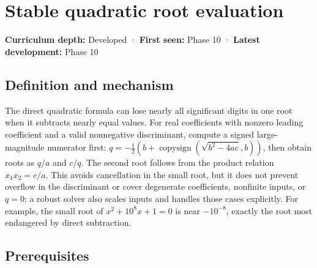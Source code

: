 \hypertarget{appendix-b9afba7f63e5}{}\label{referencestart:appendix-b9afba7f63e5}
\section{Stable quadratic root evaluation}\label{appendix-b9afba7f63e5-stable-quadratic-root-evaluation}

\hypertarget{appendix-b9afba7f63e5-stable-quadratic-root-evaluation}{}

\textbf{Curriculum depth:} Developed · \textbf{First seen:} Phase 10 · \textbf{Latest development:} Phase 10

\begin{allmightroledefinition}

\subsection{Definition and mechanism}\label{appendix-b9afba7f63e5-definition-and-mechanism}

\hypertarget{appendix-b9afba7f63e5-definition-and-mechanism}{}

The direct quadratic formula can lose nearly all significant digits in one root when it subtracts nearly equal values. For real coefficients with nonzero leading coefficient and a valid nonnegative discriminant, compute a signed large-magnitude numerator first: \(q=-\frac12(b+\operatorname{copysign}(\sqrt{b^2-4ac},b))\), then obtain roots as \(q/a\) and \(c/q\). The second root follows from the product relation \(x_1x_2=c/a\). This avoids cancellation in the small root, but it does not prevent overflow in the discriminant or cover degenerate coefficients, nonfinite inputs, or \(q=0\); a robust solver also scales inputs and handles those cases explicitly. For example, the small root of \(x^2+10^8x+1=0\) is near \(-10^{-8}\), exactly the root most endangered by direct subtraction.

\end{allmightroledefinition}

\subsection{Prerequisites}\label{appendix-b9afba7f63e5-prerequisites}

\hypertarget{appendix-b9afba7f63e5-prerequisites}{}

